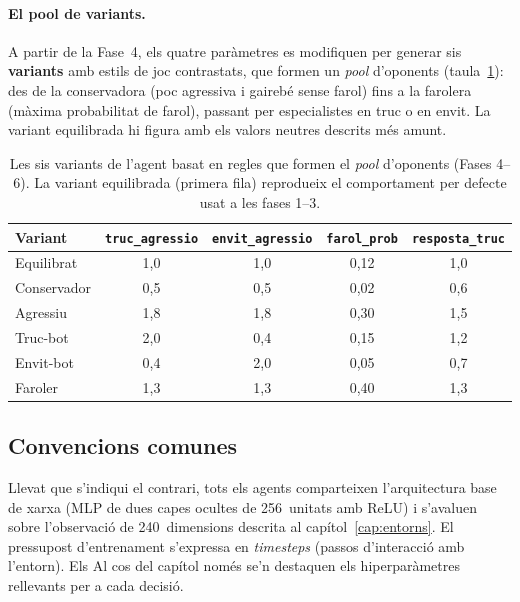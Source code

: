 \paragraph{El pool de variants.} A partir de la Fase~4, els quatre paràmetres es
modifiquen per generar sis \textbf{variants} amb estils de joc contrastats, que formen un
\emph{pool} d'oponents (taula~\ref{tab:pool-variants}): des de la conservadora (poc
agressiva i gairebé sense farol) fins a la farolera (màxima probabilitat de farol),
passant per especialistes en truc o en envit. La variant equilibrada hi figura amb els
valors neutres descrits més amunt.

\begin{table}[H]
  \centering
  \begin{tabular}{lcccc}
    \toprule
    Variant & \texttt{truc\_agressio} & \texttt{envit\_agressio} & \texttt{farol\_prob} & \texttt{resposta\_truc} \\
    \midrule
    Equilibrat  & 1{,}0 & 1{,}0 & 0{,}12 & 1{,}0 \\
    Conservador & 0{,}5 & 0{,}5 & 0{,}02 & 0{,}6 \\
    Agressiu    & 1{,}8 & 1{,}8 & 0{,}30 & 1{,}5 \\
    Truc-bot    & 2{,}0 & 0{,}4 & 0{,}15 & 1{,}2 \\
    Envit-bot   & 0{,}4 & 2{,}0 & 0{,}05 & 0{,}7 \\
    Faroler     & 1{,}3 & 1{,}3 & 0{,}40 & 1{,}3 \\
    \bottomrule
  \end{tabular}
  \caption{Les sis variants de l'agent basat en regles que formen el \emph{pool}
           d'oponents (Fases 4--6). La variant equilibrada (primera fila) reprodueix el
           comportament per defecte usat a les fases 1--3.}
  \label{tab:pool-variants}
\end{table}

\subsection*{Convencions comunes}

Llevat que s'indiqui el contrari, tots els agents comparteixen l'arquitectura base de
xarxa (\ac{MLP} de dues capes ocultes de 256~unitats amb ReLU) i s'avaluen sobre
l'observació de 240~dimensions descrita al capítol~\ref{cap:entorns}. El pressupost
d'entrenament s'expressa en \emph{timesteps} (passos d'interacció amb l'entorn). Els
Al cos del capítol només se'n destaquen els hiperparàmetres rellevants per a cada decisió.




